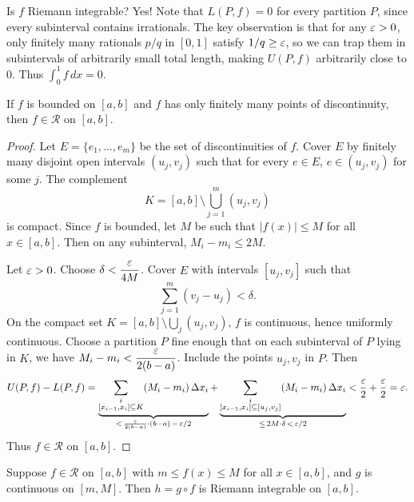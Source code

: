 \documentclass[../master/master.tex]{subfiles}
\begin{document}
\noindent Is $f$ Riemann integrable? Yes! Note that $L(P,f) = 0$ for every partition $P$, since every subinterval contains irrationals. The key observation is that for any $\varepsilon > 0$, only finitely many rationals $p/q$ in $[0,1]$ satisfy $1/q \geq \varepsilon$, so we can trap them in subintervals of arbitrarily small total length, making $U(P,f)$ arbitrarily close to $0$. Thus $\int_0^1 f\,dx = 0$.

\begin{theorem}
If $f$ is bounded on $[a,b]$ and $f$ has only finitely many points of discontinuity, then $f \in \mathscr{R}$ on $[a,b]$.
\end{theorem}

\begin{proof}
Let $E = \{e_1, \dots, e_m\}$ be the set of discontinuities of $f$. Cover $E$ by finitely many disjoint open intervals $(u_j, v_j)$ such that for every $e \in E$, $e \in (u_j, v_j)$ for some $j$. The complement
\[
K = [a,b] \setminus \bigcup_{j=1}^{m} (u_j, v_j)
\]
is compact. Since $f$ is bounded, let $M$ be such that $|f(x)| \leq M$ for all $x \in [a,b]$. Then on any subinterval, $M_i - m_i \leq 2M$.

Let $\varepsilon > 0$. Choose $\delta < \dfrac{\varepsilon}{4M}$. Cover $E$ with intervals $[u_j, v_j]$ such that
\[
\sum_{j=1}^{m} (v_j - u_j) < \delta.
\]
On the compact set $K = [a,b] \setminus \bigcup_j (u_j, v_j)$, $f$ is continuous, hence uniformly continuous. Choose a partition $P$ fine enough that on each subinterval of $P$ lying in $K$, we have $M_i - m_i < \dfrac{\varepsilon}{2(b-a)}$. Include the points $u_j, v_j$ in $P$. Then
\[
U(P,f) - L(P,f) = \underbrace{\sum_{\substack{i \\ [x_{i-1},x_i] \subseteq K}} (M_i - m_i)\,\Delta x_i}_{< \,\frac{\varepsilon}{2(b-a)} \cdot (b-a) \,=\, \varepsilon/2} + \underbrace{\sum_{\substack{i \\ [x_{i-1},x_i] \subseteq [u_j,v_j]}} (M_i - m_i)\,\Delta x_i}_{\leq \,2M \cdot \delta \,<\, \varepsilon/2} < \frac{\varepsilon}{2} + \frac{\varepsilon}{2} = \varepsilon.
\]
Thus $f \in \mathscr{R}$ on $[a,b]$.
\end{proof}

\begin{theorem}
Suppose $f \in \mathscr{R}$ on $[a,b]$ with $m \leq f(x) \leq M$ for all $x \in [a,b]$, and $g$ is continuous on $[m, M]$. Then $h = g \circ f$ is Riemann integrable on $[a,b]$.
\end{theorem}
\end{document}
